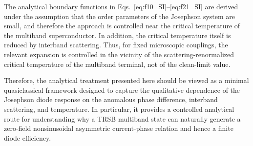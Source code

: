 \documentclass[twocolumn,secnumarabic,amssymb, nobibnotes, aps, prl, superscriptaddress]{revtex4-2}
\begin{document}
The analytical boundary functions in Eqs.~\eqref{eq:f10_SI}--\eqref{eq:f21_SI} are derived under the assumption that the order parameters of the Josephson system are small, and therefore the approach is controlled near the critical temperature of the multiband superconductor. In addition, the critical temperature itself is reduced by interband scattering. Thus, for fixed microscopic couplings, the relevant expansion is controlled in the vicinity of the scattering-renormalized critical temperature of the multiband terminal, not of the clean-limit value.

Therefore, the analytical treatment presented here should be viewed as a minimal quasiclassical framework designed to capture the qualitative dependence of the Josephson diode response on the anomalous phase difference, interband scattering, and temperature. In particular, it provides a controlled analytical route for understanding why a TRSB multiband state can naturally generate a zero-field nonsinusoidal asymmetric current-phase relation and hence a finite diode efficiency.
\end{document}
